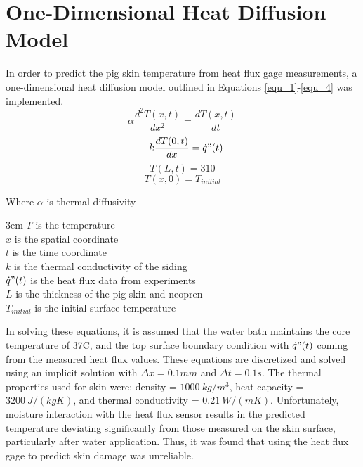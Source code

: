 \clearpage
\chapter{One-Dimensional Heat Diffusion Model} \label{App:1D_Heat_Diffusion}

 In order to predict the pig skin temperature from heat flux gage measurements, a one-dimensional heat diffusion model outlined in Equations \ref{equ_1}-\ref{equ_4} was implemented.
 \begin{equation} \label{equ_1} \alpha \frac{d^2T(x,t)}{dx^2} = \frac{dT(x,t)}{dt} \end{equation}
 \begin{equation} \label{equ_2} -k\frac{dT(0,t)}{dx} = \dot{q}"(t) \end{equation}
 \begin{equation} \label{equ_3} T(L,t) = 310 \end{equation}
 \begin{equation} \label{equ_4} T(x,0) = T_{initial} \end{equation}

Where $\alpha$ is thermal diffusivity

\noindent\hangindent3em
$T$ is the temperature\\
$x$ is the spatial coordinate\\
$t$ is the time coordinate\\
$k$ is the thermal conductivity of the siding\\
$\dot{q}"(t)$ is the heat flux data from experiments\\
$L$ is the thickness of the pig skin and neopren\\
$T_{initial}$ is the initial surface temperature\

In solving these equations, it is assumed that the water bath maintains the core temperature of 37\textdegree C, and the top surface boundary condition with $\dot{q}"(t)$ coming from the measured heat flux values. These equations are discretized and solved using an implicit solution with $\Delta x=0.1 mm$ and $\Delta t=0.1 s$. The thermal properties used for skin were: density = $1000\ kg/m^3$, heat capacity = $3200\ J/(kgK)$, and thermal conductivity = $0.21\ W/(mK)$. Unfortunately, moisture interaction with the heat flux sensor results in the predicted temperature deviating significantly from those measured on the skin surface, particularly after water application.  Thus, it was found that using the heat flux gage to predict skin damage was unreliable.

